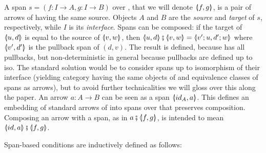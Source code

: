A span $s = (f: I \to A, g:I \to B)$ over , that we will denote $\spanof f g$, is a pair of arrows of  having the same source. Objects $A$ and $B$ are the \emph{source} and \emph{target} of $s$, respectively, while $I$ is its \emph{interface}. Spans can be composed: if the target of $\spanof u d$ is equal to the source of $\spanof v w$, then $\spanof u d \spcomp \spanof v w=\spanof{v';u}{d';w}$ where $\spanof {v'}{d'}$ is the pullback span of $(d,v)$. The result is defined, because  has all pullbacks, but non-deterministic in general because pullbacks are defined up to iso. The standard solution would be to consider spans up to isomorphism of their interface (yielding category {\SpanC} having the same objects of  and equivalence classes of spans as arrows), but to avoid further technicalities we will gloss over this along the paper.
An arrow $a:A \to B$ can be seen as a span $\spanof{id_A}{a}$. This defines an embedding of standard arrows of  into spans over  that preserves composition. Composing an arrow with a span, as in $a \spcomp \spanof f g$, is intended to mean $\spanof{id}{a}  \spcomp \spanof f g$.

\medskip\noindent
Span-based conditions are inductively defined as follows:

